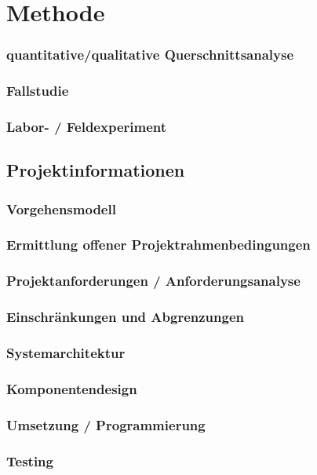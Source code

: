 \chapter{Methode}
\subsection{quantitative/qualitative Querschnittsanalyse}

\subsection{Fallstudie}

\subsection{Labor- / Feldexperiment}

\section{Projektinformationen}

\subsection{Vorgehensmodell}

\subsection{Ermittlung offener Projektrahmenbedingungen}
\label{ch:evaluation}

\subsection{Projektanforderungen / Anforderungsanalyse}
\label{sub:Anforderungen}

\subsection{Einschränkungen und Abgrenzungen}

\subsection{Systemarchitektur}

\subsection{Komponentendesign}

\subsection{Umsetzung / Programmierung}

\subsection{Testing}
